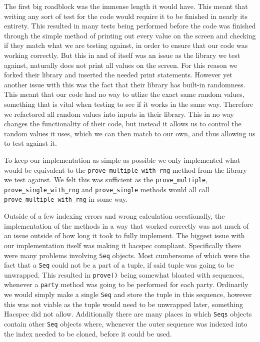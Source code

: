 \documentclass{article}
\begin{document}
The first big roadblock was the immense length it would have. This meant that writing any sort of test for the code would require it to be finished in nearly its entirety. This resulted in many tests being performed before the code was finished through the simple method of printing out every value on the screen and checking if they match what we are testing against, in order to ensure that our code was working correctly. But this in and of itself was an issue as the library we test against, naturally does not print all values on the screen. For this reason we forked their library and inserted the needed print statements. However yet another issue with this was the fact that their library has built-in randomness. This meant that our code had no way to utlize the exact same random values, something that is vital when testing to see if it works in the same way. Therefore we refactored all random values into inputs in their library. This in no way changes the functionality of their code, but instead it allows us to control the random values it uses, which we can then match to our own, and thus allowing us to test against it. 

To keep our implementation as simple as possible we only implemented what would be equivalent to the \texttt{prove\_multiple\_with\_rng} method from the library we test against. We felt this was sufficient as the \texttt{prove\_multiple}, \texttt{prove\_single\_with\_rng} and \texttt{prove\_single} methods would all call \texttt{prove\_multiple\_with\_rng} in some way.

Outside of a few indexing errors and wrong calculation occationally, the implementation of the methods in a way that worked correctly was not much of an issue outside of how long it took to fully implement. The biggest issue with our implementation itself was making it hacspec compliant. Specifically there were many problems involving \texttt{Seq} objects. Most cumbersome of which were the fact that a \texttt{Seq} could not be a part of a tuple, if said tuple was going to be unwrapped. This resulted in \texttt{prove()} being somewhat bloated with sequences, whenever a \texttt{party} method was going to be performed for each party. Ordinarily we would simply make a single \texttt{Seq} and store the tuple in this sequence, however this was not viable as the tuple would need to be unwrapped later, something Hacspec did not allow. Additionally there are many places in which \texttt{Seqs} objects contain other \texttt{Seq} objects where, whenever the outer sequence was indexed into the index needed to be cloned, before it could be used. 
\end{document}
